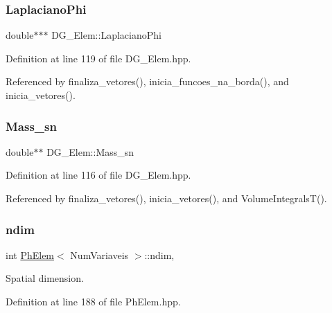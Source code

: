 \subsubsection{\texorpdfstring{Laplaciano\+Phi}{LaplacianoPhi}}
{\footnotesize\ttfamily double$\ast$$\ast$$\ast$ D\+G\+\_\+\+Elem\+::\+Laplaciano\+Phi\hspace{0.3cm}{\ttfamily [private]}}



Definition at line 119 of file D\+G\+\_\+\+Elem.\+hpp.



Referenced by finaliza\+\_\+vetores(), inicia\+\_\+funcoes\+\_\+na\+\_\+borda(), and inicia\+\_\+vetores().

\mbox{\label{classDG__Elem_a53a6e2f1c4d46714b67f131f44902fc3}} 
\subsubsection{\texorpdfstring{Mass\+\_\+sn}{Mass\_sn}}
{\footnotesize\ttfamily double$\ast$$\ast$ D\+G\+\_\+\+Elem\+::\+Mass\+\_\+sn\hspace{0.3cm}{\ttfamily [private]}}



Definition at line 116 of file D\+G\+\_\+\+Elem.\+hpp.



Referenced by finaliza\+\_\+vetores(), inicia\+\_\+vetores(), and Volume\+Integrals\+T().

\mbox{\label{classPhElem_af3ea3f4193f7d65855c3fabead6f2545}} 
\subsubsection{\texorpdfstring{ndim}{ndim}}
{\footnotesize\ttfamily int \hyperlink{classPhElem}{Ph\+Elem}$<$ Num\+Variaveis $>$\+::ndim\hspace{0.3cm}{\ttfamily [protected]}, {\ttfamily [inherited]}}



Spatial dimension. 



Definition at line 188 of file Ph\+Elem.\+hpp.



